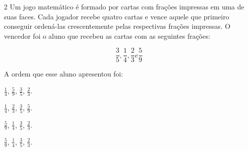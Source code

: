 \num{2}  Um jogo matemático é formado por cartas com frações impressas em uma
de suas faces. Cada jogador recebe quatro cartas e vence aquele que
primeiro conseguir ordená-las crescentemente pelas respectivas frações
impressas. O vencedor foi o aluno que recebeu as cartas com as seguintes frações:

$$\frac{3}{5}, \frac{1}{4}, \frac{2}{3} e \frac{5}{9}$$

A ordem que esse aluno apresentou foi:

\begin{escolha}
\item $\frac{1}{4}$, $\frac{5}{9}$, $\frac{3}{5}$, $\frac{2}{3}$.
\item $\frac{1}{4}$, $\frac{2}{3}$, $\frac{3}{5}$, $\frac{5}{9}$.
\item $\frac{5}{9}$, $\frac{1}{4}$, $\frac{3}{5}$, $\frac{2}{3}$.
\item $\frac{5}{9}$, $\frac{1}{4}$, $\frac{3}{5}$, $\frac{2}{3}$.
\end{escolha}





